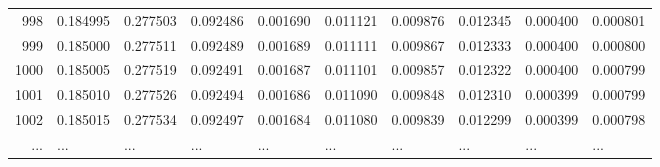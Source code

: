 \documentclass[lettersize,journal]{IEEEtran}
\begin{document}
\begin{table}[t!]
\begin{center}
\begin{tabular}{r|l|l|l|l|l|l|l|l|l}
      998            & 0.184995                              & 0.277503           & 0.092486                                & 0.001690                             & 0.011121           & 0.009876           & 0.012345           & 0.000400          & 0.000801      \\
      999            & 0.185000                              & 0.277511           & 0.092489                                & 0.001689                             & 0.011111           & 0.009867           & 0.012333           & 0.000400          & 0.000800      \\
      1000           & 0.185005                              & 0.277519           & 0.092491                                & 0.001687                             & 0.011101           & 0.009857           & 0.012322           & 0.000400          & 0.000799      \\
      1001           & 0.185010                              & 0.277526           & 0.092494                                & 0.001686                             & 0.011090           & 0.009848           & 0.012310           & 0.000399          & 0.000799      \\
      1002           & 0.185015                              & 0.277534           & 0.092497                                & 0.001684                             & 0.011080           & 0.009839           & 0.012299           & 0.000399          & 0.000798      \\

      ...            & ...                                   & ...                & ...                                     & ...                                  & ...                & ...                & ...                & ...               & ...           \\


\end{tabular}
\end{center}
\end{table}
\end{document}
